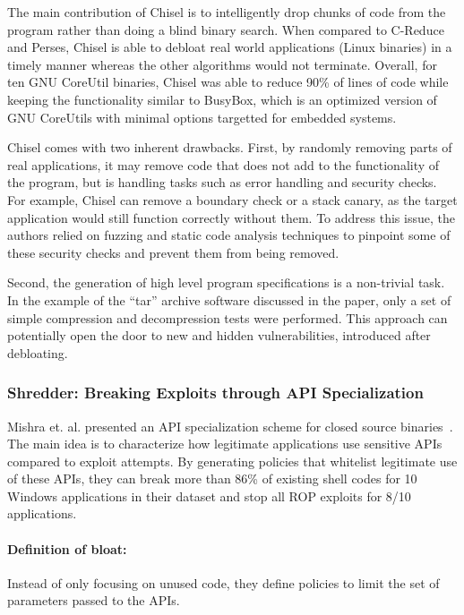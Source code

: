 The main contribution of Chisel is to intelligently drop chunks of code from the program rather than doing a blind binary search. When compared to C-Reduce and Perses, Chisel is able to debloat real world applications (Linux binaries) in a timely manner whereas the other algorithms would not terminate. Overall, for ten GNU CoreUtil binaries, Chisel was able to reduce 90\% of lines of code while keeping the functionality similar to BusyBox, which is an optimized version of GNU CoreUtils with minimal options targetted for embedded systems.

Chisel comes with two inherent drawbacks. First, by randomly removing parts of real applications, it may remove code that does not add to the functionality of the program, but is handling tasks such as error handling and security checks.
For example, Chisel can remove a boundary check or a stack canary, as the target application would still function correctly without them. To address this issue, the authors relied on fuzzing and static code analysis techniques to pinpoint some of these
security checks and prevent them from being removed.

Second, the generation of high level program specifications is a non-trivial task. In the example of the ``tar'' archive software discussed in the paper, only a set of simple compression and decompression tests were performed.  This approach can potentially open the door to new and hidden vulnerabilities, introduced after debloating.

\subsubsection{Shredder: Breaking Exploits through API Specialization}
Mishra et. al. presented an API specialization scheme for closed source binaries~\cite{mishra2018shredder}. The main idea is to characterize how legitimate applications use sensitive APIs compared to exploit attempts. By generating policies that
whitelist legitimate use of these APIs, they can break more than 86\% of existing shell codes for 10 Windows applications in their dataset and stop all ROP exploits for 8/10 applications.

\paragraph{Definition of bloat:} Instead of only focusing on unused code, they define policies to limit the set of parameters passed to the APIs.
